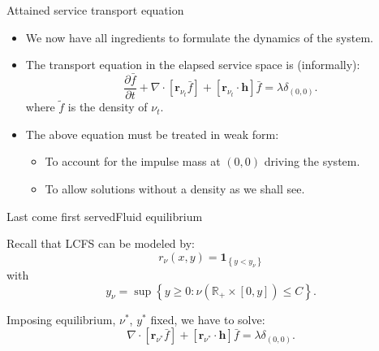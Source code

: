 \documentclass[aspectratio=169]{beamer}
\newcommand{\R}{\mathbb{R}}
\newcommand{\ind}[1]{\mathbf{1}_{\left\{#1\right\}}}
\newenvironment*{myitem}[1][1.5em]{\begin{itemize}\setlength{\itemsep}{#1}}{\end{itemize}}
\begin{document}
\begin{frame}{Attained service transport equation}

	\begin{myitem}
		\item We now have all ingredients to formulate the dynamics of the system.
		\item The transport equation in the elapsed service space is (informally):
		\begin{equation*}
			\frac{\partial \bar f}{\partial t} + \nabla \cdot\left[\mathbf{r}_{\nu_t} \bar{f}\right] + [\mathbf{r}_{\nu_t}\cdot \mathbf{h}]\bar{f}= \lambda \delta_{(0,0)}.
		\end{equation*}
		where $\tilde{f}$ is the density of $\nu_t$.
		\pause
		\item The above equation must be treated in weak form:
		 \begin{itemize}
			\item To account for the impulse mass at $(0,0)$ driving the system.
			\item To allow solutions without a density as we shall see.
		 \end{itemize}
	\end{myitem}


\end{frame}


\begin{frame}{Last come first served}{Fluid equilibrium}

	Recall that LCFS can be modeled by:
	\begin{equation*}
		r_{\nu}(x, y) = \ind{y < y_\nu}
	\end{equation*}
	with
	\begin{equation*}
	y_\nu = \sup \left\{y \geq 0: \nu(\R_+ \times [0, y]) \leqslant C\right\}.
	\end{equation*}

	\pause
	\vfill
	Imposing equilibrium, $\nu^*$, $y^*$ fixed, we have to solve: 
	\begin{equation*}
		\nabla \cdot\left[\mathbf{r}_{\nu^*} \bar{f}\right] + [\mathbf{r}_{\nu^*}\cdot \mathbf{h}]\bar{f}= \lambda \delta_{(0,0)}.
	\end{equation*}

\end{frame}
\end{document}
